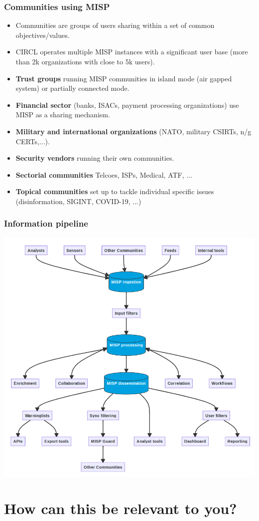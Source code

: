 \begin{frame}
 \frametitle{Communities using MISP}
 \begin{itemize}
	 \item Communities are groups of users sharing within a set of common objectives/values.
	 \item CIRCL operates multiple MISP instances with a significant user base (more than 2k organizations with close to 5k users).
         \item {\bf Trust groups} running MISP communities in island mode (air gapped system) or partially connected mode.
	 \item {\bf Financial sector} (banks, ISACs, payment processing organizations) use MISP as a sharing mechanism.
	 \item {\bf Military and international organizations} (NATO, military CSIRTs, n/g CERTs,...).
	 \item {\bf Security vendors} running their own communities.
	 \item {\bf Sectorial communities} Telcoes, ISPs, Medical, ATF, ...
         \item {\bf Topical communities} set up to tackle individual specific issues (disinformation, SIGINT, COVID-19, ...)
 \end{itemize}
\end{frame}


\begin{frame}
\frametitle{Information pipeline}
    \includegraphics[width=0.75\linewidth]{misp_data_flow.png}
\end{frame}


\section{How can this be relevant to you?}

